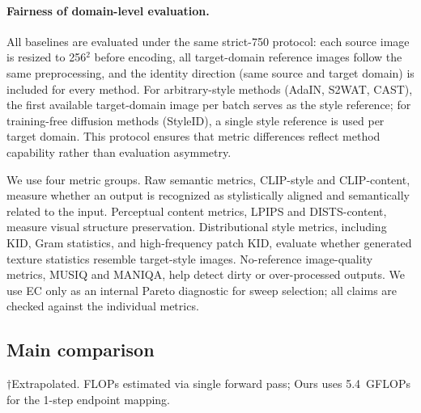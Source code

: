 ﻿\documentclass[letterpaper]{article}
\begin{document}
\paragraph{Fairness of domain-level evaluation.}
All baselines are evaluated under the same strict-750 protocol: each source image is resized to 256$^2$ before encoding, all target-domain reference images follow the same preprocessing, and the identity direction (same source and target domain) is included for every method. For arbitrary-style methods (AdaIN, S2WAT, CAST), the first available target-domain image per batch serves as the style reference; for training-free diffusion methods (StyleID), a single style reference is used per target domain. This protocol ensures that metric differences reflect method capability rather than evaluation asymmetry.

We use four metric groups. Raw semantic metrics, CLIP-style and CLIP-content, measure whether an output is recognized as stylistically aligned and semantically related to the input. Perceptual content metrics, LPIPS and DISTS-content, measure visual structure preservation. Distributional style metrics, including KID, Gram statistics, and high-frequency patch KID, evaluate whether generated texture statistics resemble target-style images. No-reference image-quality metrics, MUSIQ and MANIQA, help detect dirty or over-processed outputs. We use EC only as an internal Pareto diagnostic for sweep selection; all claims are checked against the individual metrics.

\subsection{Main comparison}
\begin{table}[t]
\centering
\caption{Strict-750 comparison with efficiency. $\uparrow$ = higher is better, $\downarrow$ = lower is better. Inference time end-to-end for 750 images. Training times marked $\dagger$ are extrapolated.}
\label{tab:main}
\small
\setlength{\tabcolsep}{5pt}
\smallskip
\footnoterule\small
$\dagger$Extrapolated. FLOPs estimated via single forward pass; Ours uses 5.4~GFLOPs for the 1-step endpoint mapping.
\end{table}
\end{document}

